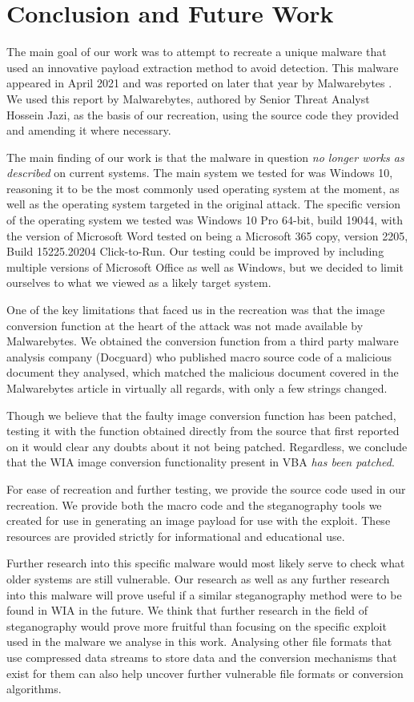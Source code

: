 \chapter{Conclusion and Future Work}
The main goal of our work was to attempt to recreate a unique malware that used an innovative payload extraction method
to avoid detection. This malware appeared in April 2021 and was reported on later that year by Malwarebytes
\cite{jazi-article}. We used this report by Malwarebytes, authored by Senior Threat Analyst Hossein Jazi, as the basis
of our recreation, using the source code they provided and amending it where necessary.

The main finding of our work is that the malware in question \emph{no longer works as described} on current systems. The
main system we tested for was Windows 10, reasoning it to be the most commonly used operating system at the moment, as
well as the operating system targeted in the original attack. 
The specific version of the operating system we tested was Windows 10 Pro 64-bit, build 19044, with the version of 
Microsoft Word tested on being a Microsoft 365 copy, version 2205, Build 15225.20204 Click-to-Run.
Our testing could be improved by including multiple versions of Microsoft Office as well as Windows, but we decided to
limit ourselves to what we viewed as a likely target system. 

One of the key limitations that faced us in the recreation was that the image conversion function at the heart of the
attack was not made available by Malwarebytes. We obtained the conversion function from a third party malware analysis
company (Docguard) who published macro source code of a malicious document they analysed, which matched the malicious
document covered in the Malwarebytes article in virtually all regards, with only a few strings changed.

Though we believe that the faulty image conversion function has been patched, testing it with the function obtained
directly from the source that first reported on it would clear any doubts about it not being patched. Regardless, we 
conclude that the \acrfull{WIA} image conversion functionality present in \acrshort{VBA} \emph{has been patched}.

For ease of recreation and further testing, we provide the source code used in our recreation. We provide both the
macro code and the steganography tools we created for use in generating an image payload for use with the exploit.
These resources are provided strictly for informational and educational use.

Further research into this specific malware would most likely serve to check what older systems are still vulnerable.
Our research as well as any further research into this malware will prove useful if a similar steganography method were
to be found in \acrshort{WIA} in the future. 
We think that further research in the field of steganography would prove more fruitful than focusing on the specific 
exploit used in the malware we analyse in this work. 
Analysing other file formats that use compressed data streams to store data and the conversion mechanisms that exist 
for them can also help uncover further vulnerable file formats or conversion algorithms. 

